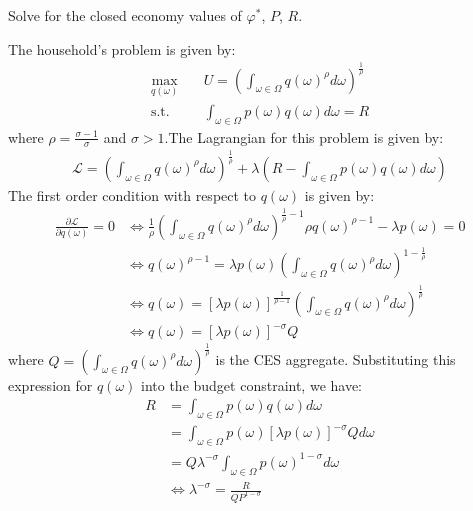 Solve for the closed economy values of $\varphi^*$, $P$, $R$.

\begin{solution}
    The household's problem is given by:
    \begin{align*}
        \max_{q(\omega)} \quad & U = \left( \int_{\omega \in \Omega} q(\omega)^{\rho} d\omega \right)^{\frac{1}{\rho}} \\
        \text{s.t.} \quad & \int_{\omega \in \Omega} p(\omega) q(\omega) d\omega = R
    \end{align*}
    where $\rho = \frac{\sigma - 1}{\sigma}$ and $\sigma > 1$.The Lagrangian for this problem is given by:
    \begin{align*}
        \mathcal{L} = \left( \int_{\omega \in \Omega} q(\omega)^{\rho} d\omega \right)^{\frac{1}{\rho}} + \lambda \left( R - \int_{\omega \in \Omega} p(\omega) q(\omega) d\omega \right)
    \end{align*}
    The first order condition with respect to $q(\omega)$ is given by:
    \begin{align*}
        \frac{\partial \mathcal{L}}{\partial q(\omega)} = 0 &\iff \frac{1}{\rho} \left( \int_{\omega \in \Omega} q(\omega)^{\rho} d\omega \right)^{\frac{1}{\rho} - 1} \rho q(\omega)^{\rho - 1} - \lambda p(\omega) = 0 \\
        &\iff q(\omega)^{\rho - 1} = \lambda p(\omega) \left( \int_{\omega \in \Omega} q(\omega)^{\rho} d\omega \right)^{1 - \frac{1}{\rho}} \\
        &\iff q(\omega) = \left[ \lambda p(\omega) \right]^{\frac{1}{\rho - 1}} \left( \int_{\omega \in \Omega} q(\omega)^{\rho} d\omega \right)^{\frac{1}{\rho} } \\
        &\iff q(\omega) = \left[ \lambda p(\omega) \right]^{-\sigma} Q 
    \end{align*}
    where $Q = \left( \int_{\omega \in \Omega} q(\omega)^{\rho} d\omega \right)^{\frac{1}{\rho}}$ is the CES aggregate. Substituting this expression for $q(\omega)$ into the budget constraint, we have:
    \begin{align*}
        R &= \int_{\omega \in \Omega} p(\omega) q(\omega) d\omega \\
        &= \int_{\omega \in \Omega} p(\omega) \left[ \lambda p(\omega) \right]^{-\sigma} Q d\omega \\
        &= Q \lambda^{-\sigma} \int_{\omega \in \Omega} p(\omega)^{1 - \sigma} d\omega \\
        &\iff \lambda^{-\sigma} = \frac{R}{Q P^{1 - \sigma}} 
    \end{align*}

\end{solution}

